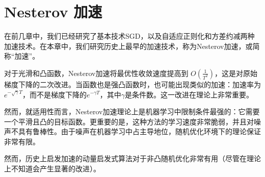 \chapter{
    Nesterov 加速
    } 


在前几章中，我们已经研究了基本技术SGD，以及自适应正则化和方差约减两种加速技术。在本章中，我们研究历史上最早的加速技术，称为Nesterov加速，或简称“加速”。

对于光滑和凸函数，Nesterov加速将最优性收敛速度提高到 $O(\frac{1}{T^2})$，这是对原始梯度下降的二次改进。当函数也是强凸函数时，也可能出现类似的加速：加速率为 $e^{-\sqrt{\gamma} T}$，而不是梯度下降的$e^{-\gamma T}$，其中$\gamma$是条件数。这一改进在理论上非常重要。

然而，就适用性而言，Nesterov加速理论上是机器学习中限制条件最强的：它需要一个平滑且凸的目标函数。更重要的是，这种方法的学习速度非常脆弱，并且对噪声不具有鲁棒性。由于噪声在机器学习中占主导地位，随机优化环境下的理论保证非常有限。

然而，历史上启发加速的动量启发式算法对于非凸随机优化非常有用（尽管在理论上不知道会产生显著的改进）。



